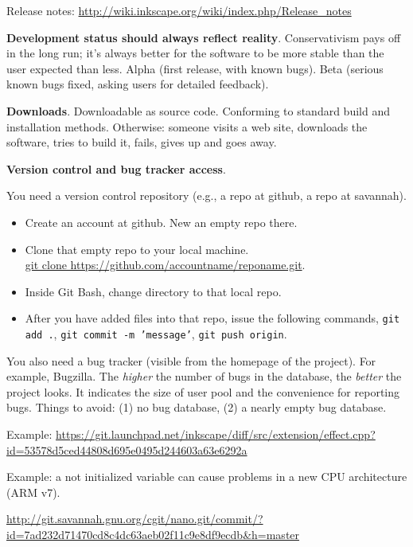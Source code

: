 \documentclass[landscape,30pt]{foils}
\begin{document}
Release notes:  \url{http://wiki.inkscape.org/wiki/index.php/Release\_notes}


{\bf Development status should always reflect reality}.
Conservativism pays off in the long run; it's always better for the
software to be more stable than the user expected than less.  Alpha (first release, with known bugs).  Beta (serious known bugs fixed, asking users for detailed feedback).

{\bf Downloads}.  Downloadable as source code.   Conforming to standard build and installation methods.
Otherwise: someone visits a web site, downloads the software, tries to build it, fails, gives up and goes away.

{\bf Version control and bug tracker access}.

You need a version control repository (e.g., a repo at github, a repo at savannah).

\begin{itemize}
\item Create an account at github.  New an empty repo there.
\item Clone that empty repo to your local machine.  \\
  \url{git clone https://github.com/accountname/reponame.git}.
\item Inside Git Bash, change directory to that local repo.
\item After you have added files into that repo, issue the following commands, \texttt{git add .}, \texttt{git commit -m 'message'}, \texttt{git push origin}.
\end{itemize}


You also need a bug tracker (visible from the homepage of the
project).  For example, Bugzilla.  The {\em higher} the number of bugs
in the database, the {\em better} the project looks.  It indicates the
size of user pool and the convenience for reporting bugs.  Things to
avoid: (1) no bug database, (2) a nearly empty bug database.

Example: \url{https://git.launchpad.net/inkscape/diff/src/extension/effect.cpp?id=53578d5ced44808d695e0495d244603a63e6292a}

Example: a not initialized variable can cause problems in a new CPU architecture (ARM v7).

\url{http://git.savannah.gnu.org/cgit/nano.git/commit/?id=7ad232d71470cd8c4dc63aeb02f11c9e8df9ecdb&h=master}
\end{document}
